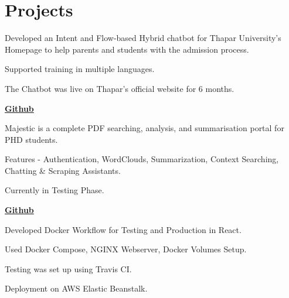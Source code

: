 \documentclass[]{deedy-resume-openfont}
\begin{document}
\begin{minipage}[t]{0.65\textwidth}


\section{Projects}

\location{}
\begin{tightemize}
\item Developed an Intent and Flow-based Hybrid chatbot for Thapar University’s Homepage to help parents and students with the admission process.
\item Supported training in multiple languages.
\item The Chatbot was live on Thapar's official website for 6 months.
\end{tightemize}
\sectionsep

 \href{https://github.com/meyash/majestic}{\bf Github}
\location{}
\begin{tightemize}
\item Majestic is a complete PDF searching, analysis, and summarisation portal for PHD students.
\item Features - Authentication, WordClouds, Summarization, Context Searching, Chatting & Scraping Assistants.
\item Currently in Testing Phase.
\end{tightemize}
\sectionsep

 \href{https://github.com/meyash/docker_production_workflow}{\bf  Github}
\location{}
\begin{tightemize}
\item Developed Docker Workflow for Testing and Production in React.
\item Used Docker Compose, NGINX Webserver, Docker Volumes Setup.
\item Testing was set up using Travis CI.
\item Deployment on AWS Elastic Beanstalk.
\end{tightemize}
\sectionsep


\end{minipage}
\end{document}
